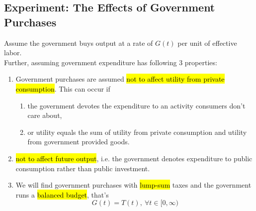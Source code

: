 \documentclass[11pt]{article}
\begin{document}
		\subsection{Experiment: The Effects of Government Purchases}
			\begin{assumption}
				Assume the government buys output at a rate of $G(t)$ per unit of effective labor.\\
				Further, assuming government expenditure has following 3 properties:
				\begin{enumerate}
					\item Government purchases are assumed \hl{not to affect utility from private consumption}. This can occur if
					\begin{enumerate}
						\item the government devotes the expenditure to an activity consumers don't care about, 
						\item or utility equals the sum of utility from private consumption and utility from government provided goods.
					\end{enumerate}
					\item \hl{not to affect future output}, i.e. the government denotes expenditure to public consumption rather than public investment.
					\item We will find government purchases with \hl{lump-sum} taxes and the government runs a \hl{balanced budget}, that's
					\[
						G(t) = T(t),\ \forall t \in [0, \infty)
					\]
					\end{enumerate}
			\end{assumption}
\end{document}
